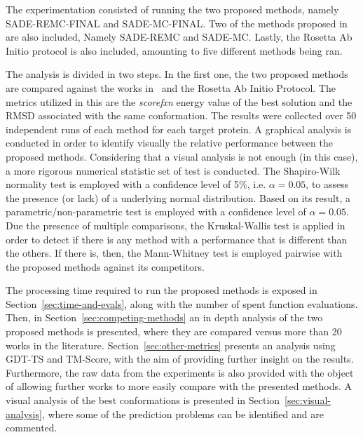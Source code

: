 The experimentation consisted of running the two proposed methods, namely
SADE-REMC-FINAL and SADE-MC-FINAL. Two of the methods proposed
in~\cite{silva2019self} are also included, Namely SADE-REMC and SADE-MC.
Lastly, the Rosetta Ab Initio protocol is also included, amounting to five
different methods being ran.

The analysis is divided in two steps. In the first one, the two proposed methods
are compared against the works in~\cite{silva2019self} and the Rosetta Ab Initio
Protocol.
The metrics utilized in this are the \textit{scorefxn} energy value of the
best solution and the \ac{RMSD} associated with the same conformation. The
results were collected over 50 independent runs of each method for each target
protein. A graphical analysis is conducted in order to identify visually the
relative performance between the proposed methods. Considering that a visual
analysis is not enough (in this case), a more rigorous numerical statistic set
of test is conducted. The Shapiro-Wilk~\cite{wilk1968joint} normality test is
employed with a confidence level of 5\%, i.e. $\alpha = 0.05$, to assess the
presence (or lack) of a underlying normal distribution. Based on its result, a
parametric/non-parametric test is employed with a confidence level of $\alpha =
0.05$. Due the presence of multiple comparisons, the Kruskal-Wallis test is
applied in order to detect if there is any method with a performance that
is different than the others. If there is, then, the Mann-Whitney test is
employed pairwise with the proposed methods against its competitors.

The processing time required to run the proposed methods is exposed in
Section~\ref{sec:time-and-evals}, along with the number of spent function
evaluations. Then, in Section~\ref{sec:competing-methods} an in depth
analysis of the two proposed methods is presented, where they are
compared versus more than 20 works in the literature.
Section~\ref{sec:other-metrics} presents an analysis using GDT-TS
and TM-Score, with the aim of providing further insight on the results.
Furthermore, the raw data from the experiments is also provided with
the object of allowing further works to more easily compare with the
presented methods. A visual analysis of the best conformations is
presented in Section~\ref{sec:visual-analysis}, where some of the
prediction problems can be identified and are commented.

